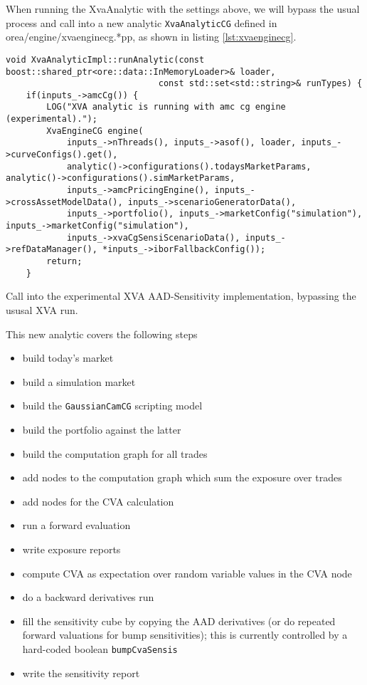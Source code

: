 When running the XvaAnalytic with the settings above, we will bypass the usual process
and call into a new analytic {\tt XvaAnalyticCG} defined in orea/engine/xvaenginecg.*pp,
as shown in listing \ref{lst:xvaenginecg}.

\begin{listing}[hbt]
\begin{verbatim}
void XvaAnalyticImpl::runAnalytic(const boost::shared_ptr<ore::data::InMemoryLoader>& loader,
                              const std::set<std::string>& runTypes) {
    if(inputs_->amcCg()) {
        LOG("XVA analytic is running with amc cg engine (experimental).");
        XvaEngineCG engine(
            inputs_->nThreads(), inputs_->asof(), loader, inputs_->curveConfigs().get(),
            analytic()->configurations().todaysMarketParams, analytic()->configurations().simMarketParams,
            inputs_->amcPricingEngine(), inputs_->crossAssetModelData(), inputs_->scenarioGeneratorData(),
            inputs_->portfolio(), inputs_->marketConfig("simulation"), inputs_->marketConfig("simulation"),
            inputs_->xvaCgSensiScenarioData(), inputs_->refDataManager(), *inputs_->iborFallbackConfig());
        return;
    }
\end{verbatim}
\caption{Call into the experimental XVA AAD-Sensitivity implementation, bypassing the ususal XVA run.}
\label{lst:xvaenginecg}
\end{listing}

This new analytic covers the following steps
\begin{itemize}
\item build today's market
\item build a simulation market
\item build the {\tt GaussianCamCG} scripting model
\item build the portfolio against the latter
\item build the computation graph for all trades
\item add nodes to the computation graph which sum the exposure over trades
\item add nodes for the CVA calculation
\item run a forward evaluation
\item write exposure reports
\item compute CVA as expectation over random variable values in the CVA node
\item do a backward derivatives run
\item fill the sensitivity cube by copying the AAD derivatives (or do repeated forward valuations for bump sensitivities);
  this is currently controlled by a hard-coded boolean {\tt bumpCvaSensis}
\item write the sensitivity report
\end{itemize}

